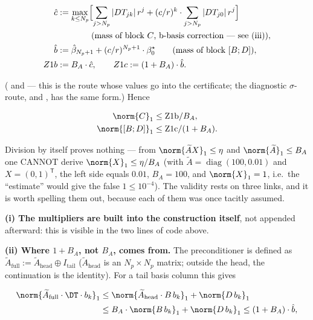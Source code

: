 \begin{align*}
\hat{c} &:= \max_{k \le N_{p}} \Bigl[ \sum_{j > N_{p}} |DT_{jk}|\, r^{j}
      + (c/r)^{k}\cdot \sum_{j > N_{p}} |DT_{j0}|\, r^{j} \Bigr] \\
   &\qquad\qquad \text{(mass of block } C \text{, b-basis correction --- see (iii))} , \notag \\
\hat{b} &:= \hat{\beta}_{N_{p}+1} + (c/r)^{N_{p}+1}\cdot \beta_{0}^{\star}
      \qquad \text{(mass of block } [B; D] \text{)} , \\
Z1b &:= B_{A} \cdot \hat{c} ,\qquad Z1c := (1 + B_{A}) \cdot \hat{b} .
\end{align*}

( and  --- this
is the route whose values go into the certificate; the diagnostic
$\sigma$-route,  and
, has the same form.) Hence

\begin{align*}
\norm{C}_{1} &\le \mathrm{Z1b} / B_{A} , \\
\norm{[B; D]}_{1} &\le \mathrm{Z1c} / (1 + B_{A}) .
\end{align*}

Division by itself proves nothing --- from
$\norm{\widetilde{A}X}_{1} \le \eta$ and $\norm{\widetilde{A}}_{1} \le B_{A}$
one CANNOT derive $\norm{X}_{1} \le \eta/B_{A}$ (with
$\widetilde{A} = \operatorname{diag}(100, 0.01)$ and
$X = (0, 1)^{\mathsf{T}}$, the left side equals $0.01$, $B_{A} = 100$, and
$\norm{X}_{1} = 1$, i.e.\ the ``estimate'' would give the false
$1 \le 10^{-4}$). The validity rests on three links, and it is worth
spelling them out, because each of them was once tacitly assumed.

\textbf{(i) The multipliers are built into the construction itself}, not
appended afterward: this is visible in the two lines of code above.

\textbf{(ii) Where $1 + B_{A}$, not $B_{A}$, comes from.} The preconditioner
is defined as $\widetilde{A}_{\mathrm{full}} :=
\widetilde{A}_{\mathrm{head}} \oplus I_{\mathrm{tail}}$
($\widetilde{A}_{\mathrm{head}}$ is an $N_{p} \times N_{p}$ matrix; outside
the head, the continuation is the identity). For a tail basis column this
gives

\begin{align*}
\norm{\widetilde{A}_{\mathrm{full}}\cdot \DT \cdot b_{k}}_{1}
   &\le \norm{\widetilde{A}_{\mathrm{head}}\cdot B\, b_{k}}_{1} + \norm{D\, b_{k}}_{1} \\
   &\le B_{A}\cdot \norm{B\, b_{k}}_{1} + \norm{D\, b_{k}}_{1}
      \le (1 + B_{A})\cdot \hat{b} ,
\end{align*}

